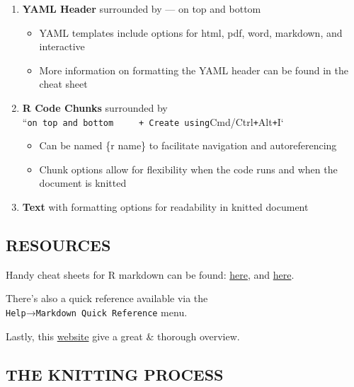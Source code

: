 \documentclass[
]{article}
\providecommand{\tightlist}{%
  \setlength{\itemsep}{0pt}\setlength{\parskip}{0pt}}
\begin{document}
\begin{enumerate}
\def\labelenumi{\arabic{enumi}.}
\tightlist
\item
  \textbf{YAML Header} surrounded by --- on top and bottom

  \begin{itemize}
  \tightlist
  \item
    YAML templates include options for html, pdf, word, markdown, and
    interactive
  \item
    More information on formatting the YAML header can be found in the
    cheat sheet
  \end{itemize}
\item
  \textbf{R Code Chunks} surrounded by
  ``\texttt{on\ top\ and\ bottom\ \ \ \ \ +\ Create\ using}Cmd/Ctrl\texttt{+}Alt\texttt{+}I`

  \begin{itemize}
  \tightlist
  \item
    Can be named \{r name\} to facilitate navigation and autoreferencing
  \item
    Chunk options allow for flexibility when the code runs and when the
    document is knitted
  \end{itemize}
\item
  \textbf{Text} with formatting options for readability in knitted
  document
\end{enumerate}

\hypertarget{resources}{%
\subsection{RESOURCES}\label{resources}}

Handy cheat sheets for R markdown can be found:
\href{https://rstudio.com/wp-content/uploads/2015/03/rmarkdown-reference.pdf}{here},
and
\href{https://raw.githubusercontent.com/rstudio/cheatsheets/master/rmarkdown-2.0.pdf}{here}.

There's also a quick reference available via the
\texttt{Help}→\texttt{Markdown\ Quick\ Reference} menu.

Lastly, this \href{https://rmarkdown.rstudio.com}{website} give a great
\& thorough overview.

\hypertarget{the-knitting-process}{%
\subsection{THE KNITTING PROCESS}\label{the-knitting-process}}
\end{document}
